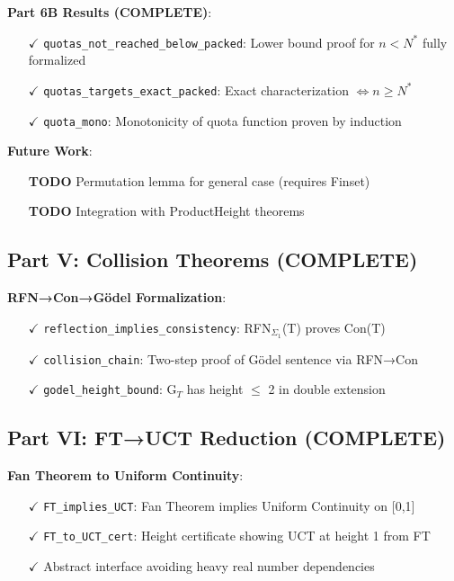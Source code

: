 \documentclass[11pt]{article}
\theoremstyle{definition}
\theoremstyle{remark}
\begin{document}
\textbf{Part 6B Results (COMPLETE)}:
\begin{itemize}
\item[$\checkmark$] \texttt{quotas\_not\_reached\_below\_packed}: Lower bound proof for $n < N^*$ fully formalized
\item[$\checkmark$] \texttt{quotas\_targets\_exact\_packed}: Exact characterization $\Leftrightarrow n \geq N^*$
\item[$\checkmark$] \texttt{quota\_mono}: Monotonicity of quota function proven by induction
\end{itemize}

\textbf{Future Work}:
\begin{itemize}
\item[\textbf{TODO}] Permutation lemma for general case (requires Finset)
\item[\textbf{TODO}] Integration with ProductHeight theorems
\end{itemize}

\subsection{Part V: Collision Theorems (COMPLETE)}

\textbf{RFN→Con→Gödel Formalization}:
\begin{itemize}
\item[$\checkmark$] \texttt{reflection\_implies\_consistency}: RFN$_{\Sigma_1}$(T) proves Con(T) 
\item[$\checkmark$] \texttt{collision\_chain}: Two-step proof of Gödel sentence via RFN→Con
\item[$\checkmark$] \texttt{godel\_height\_bound}: G$_T$ has height $\leq$ 2 in double extension
\end{itemize}

\subsection{Part VI: FT→UCT Reduction (COMPLETE)}

\textbf{Fan Theorem to Uniform Continuity}:
\begin{itemize}
\item[$\checkmark$] \texttt{FT\_implies\_UCT}: Fan Theorem implies Uniform Continuity on [0,1]
\item[$\checkmark$] \texttt{FT\_to\_UCT\_cert}: Height certificate showing UCT at height 1 from FT
\item[$\checkmark$] Abstract interface avoiding heavy real number dependencies
\end{itemize}
\end{document}
